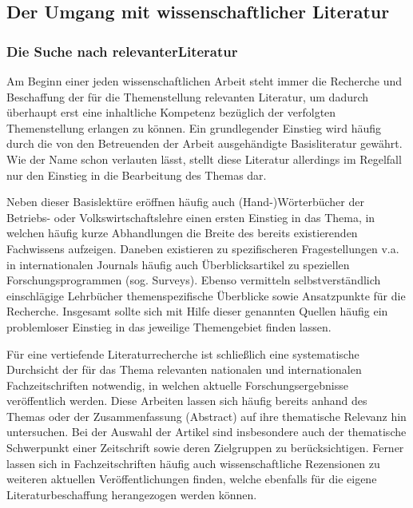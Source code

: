 \documentclass[a4paper, 12pt]{article}
\begin{document}
\subsection{Der Umgang mit wissenschaftlicher Literatur} \label{Umgang}

\subsubsection{Die Suche nach relevanterLiteratur}

Am Beginn einer jeden wissenschaftlichen Arbeit steht immer die Recherche und
Beschaffung der f\"{u}r die Themenstellung relevanten Literatur, um dadurch \"{u}berhaupt
erst eine inhaltliche Kompetenz bez\"{u}glich der verfolgten Themenstellung erlangen zu
k\"{o}nnen. Ein grundlegender Einstieg wird h\"{a}ufig durch die von den Betreuenden der
Arbeit ausgeh\"{a}ndigte Basisliteratur gew\"{a}hrt. Wie der Name schon verlauten l\"{a}sst,
stellt diese Literatur allerdings im Regelfall nur den Einstieg in die Bearbeitung
des Themas dar.

Neben dieser Basislekt\"{u}re er\"{o}ffnen h\"{a}ufig auch (Hand-)W\"{o}rterb\"{u}cher der Betriebs-
oder Volkswirtschaftslehre einen ersten Einstieg in das Thema, in welchen h\"{a}ufig
kurze Abhandlungen die Breite des bereits existierenden Fachwissens aufzeigen.
Daneben existieren zu spezifischeren Fragestellungen v.a. in internationalen
Journals h\"{a}ufig auch \"{U}berblicksartikel zu speziellen Forschungsprogrammen (sog.
\glqq Surveys\grqq). Ebenso vermitteln selbstverst\"{a}ndlich einschl\"{a}gige Lehrb\"{u}cher
themenspezifische \"{U}berblicke sowie Ansatzpunkte f\"{u}r die Recherche. Insgesamt sollte
sich mit Hilfe dieser genannten Quellen h\"{a}ufig ein problemloser Einstieg in das
jeweilige Themengebiet finden lassen.

F\"{u}r eine vertiefende Literaturrecherche ist schlie\ss lich eine systematische
Durchsicht der f\"{u}r das Thema relevanten nationalen und internationalen
Fachzeitschriften notwendig, in welchen aktuelle Forschungsergebnisse ver\"{o}ffentlich
werden. Diese Arbeiten lassen sich h\"{a}ufig bereits anhand des Themas oder der
Zusammenfassung (Abstract) auf ihre thematische Relevanz hin untersuchen. Bei der
Auswahl der Artikel sind insbesondere auch der thematische Schwerpunkt einer
Zeitschrift sowie deren Zielgruppen zu ber\"{u}cksichtigen. Ferner lassen sich in
Fachzeitschriften h\"{a}ufig auch wissenschaftliche Rezensionen zu weiteren aktuellen
Ver\"{o}ffentlichungen finden, welche ebenfalls f\"{u}r die eigene Literaturbeschaffung
herangezogen werden k\"{o}nnen.
\end{document}
